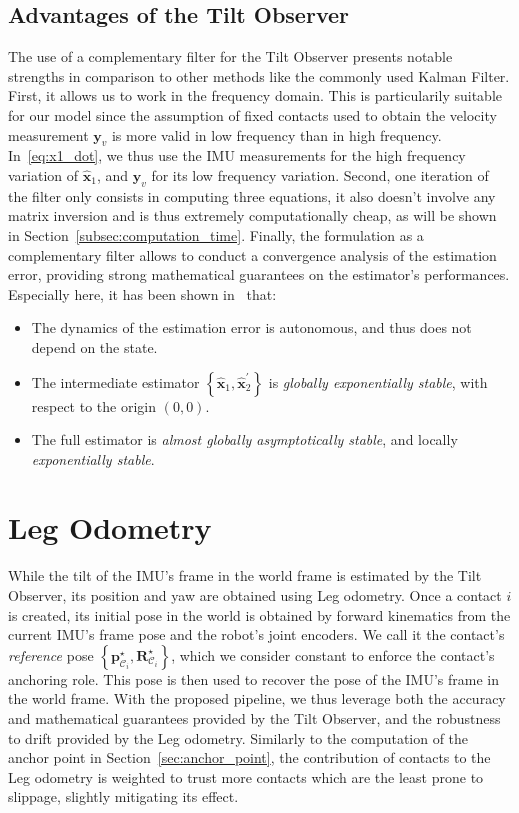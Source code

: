 \documentclass{IJCAS}
\begin{document}
\subsection{Advantages of the Tilt Observer}
The use of a complementary filter for the Tilt Observer presents notable strengths in comparison to other methods like the commonly used Kalman Filter. First, it allows us to work in the frequency domain. This is particularily suitable for our model since the assumption of fixed contacts used to obtain the velocity measurement $\boldsymbol{y}_v$ is more valid in low frequency than in high frequency. In~\eqref{eq:x1_dot}, we thus use the IMU measurements for the high frequency variation of $\hat{\boldsymbol{x}}_{1}$, and $\boldsymbol{y}_v$ for its low frequency variation. Second, one iteration of the filter only consists in computing three equations, it also doesn't involve any matrix inversion and is thus extremely computationally cheap, as will be shown in Section~\ref{subsec:computation_time}. Finally, the formulation as a complementary filter allows to conduct a convergence analysis of the estimation error, providing strong mathematical guarantees on the estimator's performances. Especially here, it has been shown in~\cite{benallegue2020LyapunovStableOrientationEstimatorHumanoids} that:
\begin{itemize}
    \item The dynamics of the estimation error is autonomous, and thus does not depend on the state. 
    \item The intermediate estimator $\left\{\hat{\boldsymbol{x}}_{1}, \hat{\boldsymbol{x}}_{2}^{\prime} \right\}$ is \emph{globally exponentially stable}, with respect to the origin $\left(0,0\right)$.
    \item The full estimator is \emph{almost globally asymptotically stable}, and locally \emph{exponentially stable}.
\end{itemize}

\section{Leg Odometry}

While the tilt of the IMU's frame in the world frame is estimated by the Tilt Observer, its position and yaw are obtained using Leg odometry. Once a contact $i$ is created, its initial pose in the world is obtained by forward kinematics from the current IMU's frame pose and the robot's joint encoders. We call it the contact's \emph{reference} pose $\left\{ \boldsymbol{p}^{\star}_{\mathcal{C}_{i}}, \boldsymbol{R}^{\star}_{\mathcal{C}_{i}}\right\}$, which we consider constant to enforce the contact's anchoring role. This pose is then used to recover the pose of the IMU's frame in the world frame. 
With the proposed pipeline, we thus leverage both the accuracy and mathematical guarantees provided by the Tilt Observer, and the robustness to drift provided by the Leg odometry. Similarly to the computation of the anchor point in Section~\ref{sec:anchor_point}, the contribution of contacts to the Leg odometry is weighted to trust more contacts which are the least prone to slippage, slightly mitigating its effect.
\end{document}
